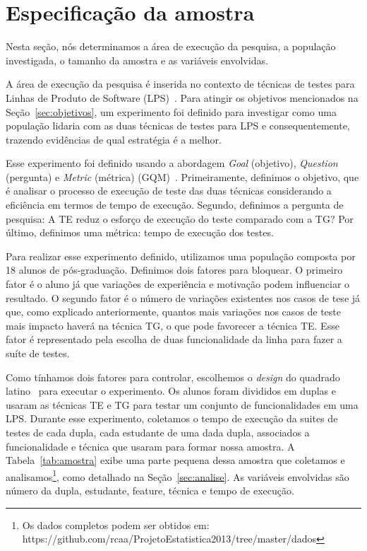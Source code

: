 \section{Especifica\c{c}\~ao da amostra}
\label{sec:especificacao}


Nesta seção, nós determinamos a área de execução da pesquisa, a população investigada, o tamanho da amostra e as variáveis envolvidas.

A área de execução da pesquisa é inserida no contexto de técnicas de testes para Linhas de Produto de Software (LPS)~\cite{pohl-book}. Para atingir os objetivos mencionados na Seção~\ref{sec:objetivos}, um experimento foi definido para investigar como uma população lidaria com as duas técnicas de testes para LPS e consequentemente, trazendo evidências de qual estratégia é a melhor.

Esse experimento foi definido usando a abordagem \emph{Goal} (objetivo),
\emph{Question} (pergunta) e \emph{Metric} (métrica) (GQM)~\cite{gqm}.
Primeiramente, definimos o objetivo, que é analisar o processo de execução de
teste das duas técnicas considerando a eficiência em termos de tempo de
execução. Segundo, definimos a pergunta de pesquisa: A TE reduz o esforço de
execução do teste comparado com a TG? Por último, definimos uma métrica: tempo
de execução dos testes.

Para realizar esse experimento definido, utilizamos uma população composta por
18 alunos de pós-graduação. Definimos dois fatores para bloquear. O primeiro
fator é o aluno já que variações de experiência e motivação podem
influenciar o resultado. O segundo fator é o número de variações existentes
nos casos de tese já que, como explicado anteriormente, quantos mais variações
nos casos de teste mais impacto haverá na técnica TG, o que pode favorecer a
técnica TE. Esse fator é representado pela escolha de duas funcionalidade da
linha para fazer a suíte de testes.

Como tínhamos dois fatores para controlar, escolhemos o \emph{design}
do quadrado latino~\cite{citeulike:2905018} para executar o experimento. Os alunos
foram divididos em duplas e usaram as técnicas TE e TG para testar um conjunto de funcionalidades em uma
LPS. Durante esse experimento, coletamos o tempo de execução da suites de
testes de cada dupla, cada estudante de uma dada dupla, associados a
funcionalidade e técnica que usaram para formar nossa amostra. A
Tabela~\ref{tab:amostra} exibe uma parte pequena dessa amostra que coletamos e analisamos\footnote{Os dados
completos podem ser obtidos em:
https://github.com/rcaa/ProjetoEstatistica2013/tree/master/dados}, como
detalhado na Seção~\ref{sec:analise}. As variáveis envolvidas são número da
dupla, estudante, feature, técnica e tempo de execução.


